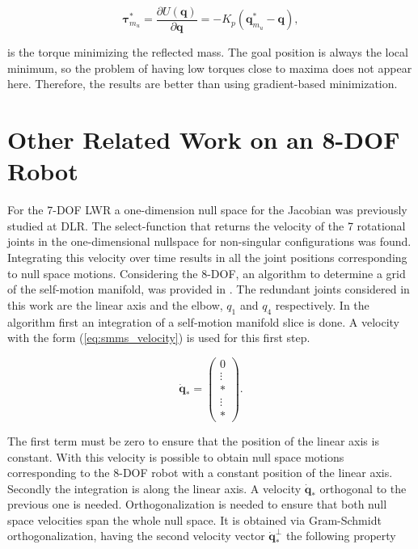 \begin{equation}
\mathbf{\tau}_{m_u}^\ast = \frac{\partial {U(\mathbf{q})}}{\partial {\mathbf{q}}} = - K_p (\mathbf{q}_{m_u}^\ast - \mathbf{q}),
\label{eq:torque_pot_intro}
\end{equation}

is the torque minimizing the reflected mass.
The goal position is always the local minimum, so the problem of having low torques close to maxima does not appear here. Therefore, the results are better than using gradient-based minimization.


\section{Other Related Work on an 8-DOF Robot}
\label{sec:Fabianstuff}


For the 7-DOF LWR a  one-dimension null space for the Jacobian   was previously studied at DLR.  
The select-function that returns the velocity of the 7 rotational joints in the one-dimensional nullspace for non-singular configurations was found. Integrating this velocity over time results in all the joint positions corresponding to null space motions.
%
Considering the  8-DOF, an algorithm to determine a grid of the self-motion manifold, was provided in \cite{fabianthesis}. The redundant joints considered in this work are the linear axis and the elbow, $q_1$ and $q_4$ respectively. In the algorithm first an integration of a self-motion manifold slice is done. A velocity with the form (\ref{eq:smms_velocity}) is used for this first step. 

\begin{equation}
\dot{\mathbf{q}}_* =\begin{pmatrix}0 \\ \vdots  \\ *\\ \vdots\\ *\end{pmatrix}.
\label{eq:smms_velocity}
\end{equation} 

The first term must be zero to ensure that the position of the linear axis is constant.
With this velocity is possible to obtain null space motions corresponding to the 8-DOF robot with a constant position of the linear axis.
Secondly the integration is along the linear axis. A velocity $\dot{\mathbf{q}}_*$ orthogonal to the previous one is needed. Orthogonalization is needed to ensure that both null space velocities span the whole null space. It is obtained via Gram-Schmidt orthogonalization, having the second velocity vector $\dot{\mathbf{q}}_*^{\bot}$ the following property


